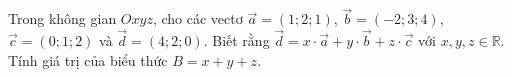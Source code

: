 \begin{ex}
Trong không gian $Oxyz$, cho các vectơ $\vec a=(1;2;1)$, $\vec b=(-2;3;4)$, $\vec c=(0;1;2)$ và $\vec d=(4;2;0)$. Biết rằng $\vec d=x\cdot\vec a+y\cdot\vec b+z\cdot\vec c$ với $x,y,z\in\mathbb R$. Tính giá trị của biểu thức $B=x+y+z$.
\end{ex}
